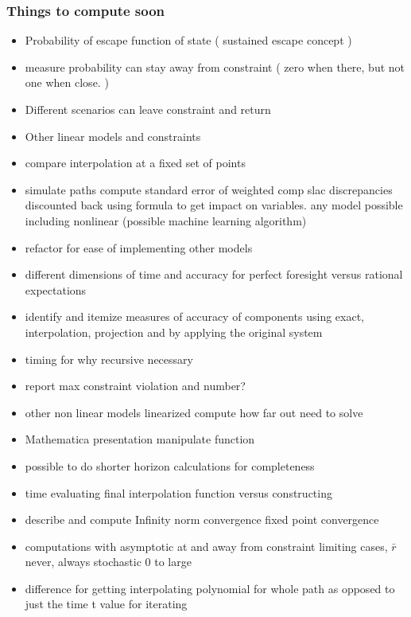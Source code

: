 \documentclass{beamer}
\begin{document}
  \begin{frame}
    \frametitle{Things to compute soon}
    \begin{itemize}
\item Probability of escape function of state  ( sustained escape concept )
\item measure probability can stay away from constraint  ( zero when there, but not one when close. )
\item Different scenarios can leave constraint and return
\item Other linear models and constraints
\item compare interpolation at a fixed set of points
    \item simulate paths compute standard error of weighted comp slac discrepancies discounted back using formula to get impact on variables.  any model possible including nonlinear  (possible machine learning algorithm)
\item refactor for ease of implementing other models
\item different dimensions of time and accuracy for perfect foresight versus rational expectations
\item identify and itemize measures of accuracy of components using exact, interpolation, projection and by applying the original system
    \item timing for why recursive necessary
    \item report max constraint violation and number?
    \item other non linear models linearized compute how far out need to solve
    \item Mathematica presentation manipulate function
    \item possible to do shorter horizon calculations for completeness
    \item time evaluating final interpolation function versus constructing
    \item describe and compute Infinity norm convergence fixed point convergence
\item computations with asymptotic at and away from constraint limiting cases, $\bar{r}$ never, always  stochastic 0 to large
\item difference for getting interpolating polynomial for whole path as opposed to just the time t value for iterating
    \end{itemize}
  \end{frame}
\end{document}
